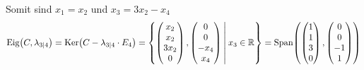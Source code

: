 \documentclass{scrreprt}
\begin{document}
\begin{enumerate}[(a)]
\begin{enumerate}
    Somit sind $x_1 = x_2$ und $x_3 = 3x_2 - x_4$
    \[
      \text{Eig}\qty\big(C, \lambda_{3|4}) =
      \text{Ker}\qty\big(C - \lambda_{3|4} \cdot E_4) =
      \qty{
        \begin{pmatrix}
          x_2  \\
          x_2  \\
          3x_2 \\
          0    \\
        \end{pmatrix}, \begin{pmatrix}
          0    \\
          0    \\
          -x_4 \\
          x_4  \\
        \end{pmatrix}
        \:\middle|\:
        x_3 \in \mathbb{R}
      } = \text{Span}\qty(
        \begin{pmatrix} 1 \\ 1 \\ 3  \\ 0 \end{pmatrix},
        \begin{pmatrix} 0 \\ 0 \\ -1 \\ 1 \end{pmatrix}
      )
    \]

  \end{enumerate}
\end{enumerate}

\newpage
\end{document}
